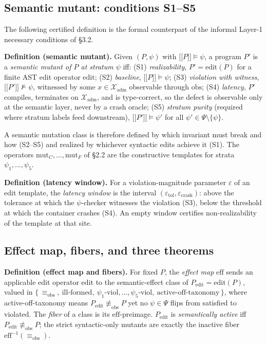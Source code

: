 \documentclass[manuscript,screen,review]{acmart}
\begin{document}
\subsection{Semantic mutant: conditions S1--S5}\label{theory-s1s5}

The following certified definition is the formal counterpart of the
informal Layer-1 necessary conditions of §3.2.

\textbf{Definition (semantic mutant).} Given $(P, \psi)$ with
$\mathopen{\lbrack\!\lbrack} P \mathclose{\rbrack\!\rbrack} \models \psi$, a program $P'$ is a
\emph{semantic mutant of $P$ at stratum $\psi$} iff: (S1)
\emph{realizability}, $P' = \mathrm{edit}(P)$ for a finite AST edit
operator $\mathrm{edit}$; (S2)
\emph{baseline}, $\mathopen{\lbrack\!\lbrack} P \mathclose{\rbrack\!\rbrack} \models \psi$; (S3)
\emph{violation with witness},
$\mathopen{\lbrack\!\lbrack} P' \mathclose{\rbrack\!\rbrack} \not\models \psi$, witnessed by some
$x \in \mathcal{X}_{\mathrm{adm}}$ observable through $\mathrm{obs}$; (S4)
\emph{latency}, $P'$ compiles, terminates on $\mathcal{X}_{\mathrm{adm}}$,
and is type-correct, so the defect is observable only at the semantic
layer, never by a crash oracle; (S5) \emph{stratum purity} (required
where stratum labels feed downstream),
$\mathopen{\lbrack\!\lbrack} P' \mathclose{\rbrack\!\rbrack} \models \psi'$ for all
$\psi' \in \Psi \setminus \{\psi\}$.

A semantic mutation class is therefore defined by which invariant must
break and how (S2--S5) and realized by whichever syntactic edits achieve
it (S1). The operators $\mathrm{mut}_C, \dots, \mathrm{mut}_F$ of §2.2
are the constructive templates for strata $\psi_1, \dots, \psi_5$.

\textbf{Definition (latency window).} For a violation-magnitude
parameter $\varepsilon$ of an edit template, the \emph{latency window}
is the interval $(\varepsilon_{\mathrm{tol}}, \varepsilon_{\mathrm{crash}})$:
above the tolerance at which the $\psi$-checker witnesses the violation
(S3), below the threshold at which the container crashes (S4). An empty
window certifies non-realizability of the template at that site.

\subsection{Effect map, fibers, and three theorems}\label{theory-fibers}

\textbf{Definition (effect map and fibers).} For fixed $P$, the
\emph{effect map} $\mathrm{eff}$ sends an applicable edit operator
$\mathrm{edit}$ to the
semantic-effect class of $P_{\mathrm{edit}} = \mathrm{edit}(P)$, valued in
$\{\, \equiv_{\mathrm{obs}},\ \text{ill-formed},\ \psi_1\text{-viol}, \dots, \psi_5\text{-viol},\ \text{active-off-taxonomy} \,\}$,
where active-off-taxonomy means $P_{\mathrm{edit}} \not\equiv_{\mathrm{obs}} P$ yet no
$\psi \in \Psi$ flips from satisfied to violated. The \emph{fiber} of a
class is its $\mathrm{eff}$-preimage. $P_{\mathrm{edit}}$ is \emph{semantically active} iff
$P_{\mathrm{edit}} \not\equiv_{\mathrm{obs}} P$; the strict syntactic-only mutants are exactly
the inactive fiber $\mathrm{eff}^{-1}(\equiv_{\mathrm{obs}})$.
\end{document}
